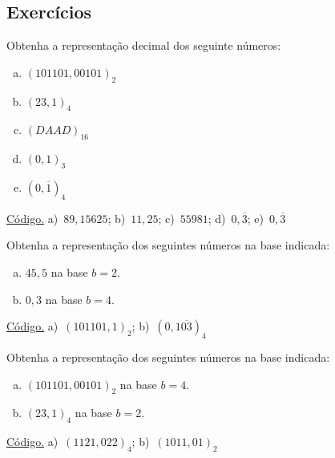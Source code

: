 \subsection*{Exercícios}

\begin{exer}\label{exer:base2dec}
  Obtenha a representação decimal dos seguinte números:
  \begin{enumerate}[a)]
  \item $(101101,00101)_2$
  \item $(23,1)_4$
  \item $(DAAD)_{16}$
  \item $(0,1)_3$
  \item $(0,\overline{1})_4$
  \end{enumerate}
\end{exer}
\begin{resp}
    \ifisoctave 
  \href{https://github.com/phkonzen/notas/blob/master/src/MatematicaNumerica/cap_aritm/dados/exer_base2dec/exer_base2dec.m}{Código.} 
  \fi
  a)~$89,15625$; b)~$11,25$; c)~$55981$; d)~$0,\overline{3}$; e)~$0,\overline{3}$
\end{resp}

\begin{exer}\label{exer_dec2base}
  Obtenha a representação dos seguintes números na base indicada:
  \begin{enumerate}[a)]
  \item $45,5$ na base $b=2$.
  \item $0,3$ na base $b=4$.
  \end{enumerate}
\end{exer}
\begin{resp}
  \ifisoctave 
  \href{https://github.com/phkonzen/notas/blob/master/src/MatematicaNumerica/cap_aritm/dados/exer_dec2base/exer_dec2base.m}{Código.} 
  \fi
  a)~$(101101,1)_2$; b)~$(0,1\overline{03})_4$
\end{resp}

\begin{exer}\label{exer_base2base}
  Obtenha a representação dos seguintes números na base indicada:
  \begin{enumerate}[a)]
  \item $(101101,00101)_2$ na base $b=4$.
  \item $(23,1)_4$ na base $b=2$.
  \end{enumerate}
\end{exer}
\begin{resp}
  \ifisoctave 
  \href{https://github.com/phkonzen/notas/blob/master/src/MatematicaNumerica/cap_aritm/dados/exer_base2base/exer_base2base.m}{Código.} 
  \fi
  a)~$(1121,022)_4$; b)~$(1011,01)_2$  
\end{resp}

